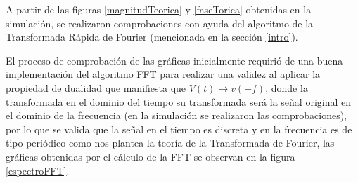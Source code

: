 \documentclass[11pt,letterpaper,twocolumn]{article}
\begin{document}
    A partir de las figuras \ref{magnitudTeorica} y \ref{faseTorica} obtenidas en la simulación, se 
    realizaron comprobaciones con ayuda del algoritmo de la Transformada Rápida de Fourier (mencionada
    en la sección \ref{intro}).
    
    El proceso de comprobación de las gráficas inicialmente requirió de una buena
    implementación del algoritmo FFT para realizar una validez al aplicar la propiedad de dualidad que
    manifiesta que $V(t)\rightarrow v(-f)$, donde la transformada en el dominio del tiempo su transformada
    será la señal original en el dominio de la frecuencia (en la simulación se realizaron las
    comprobaciones),  por lo que se valida que la señal en el tiempo es discreta y en la 
    frecuencia es de tipo periódico como nos plantea la teoría de la Transformada de Fourier,
    las gráficas obtenidas por el cálculo de la FFT se observan en la figura \ref{espectroFFT}.
    
\end{document}
